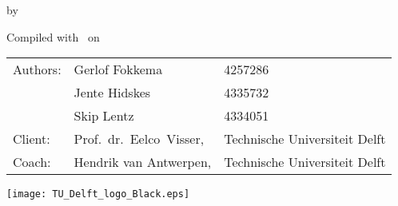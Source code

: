 \makecover

\begin{titlepage}
  \begin{center}
    {\makeatletter
    \largetitlestyle\fontsize{64}{94}\selectfont\@title
    \makeatother}

    {\makeatletter
    \ifx\@subtitle\undefined\else
        \bigskip
       {\tudsffamily\fontsize{22}{32}\selectfont\@subtitle}
    \fi
    \makeatother}

    \bigskip
    \bigskip

    by

    \bigskip
    \bigskip

    {\makeatletter
    \largetitlestyle\fontsize{26}{26}\selectfont\@author
    \makeatother}

    \bigskip
    \bigskip
    \vfill

    {\makeatletter\large
    Compiled with \XeLaTeX\ on \@date\par
    \makeatother}

    \bigskip
    \bigskip
    \vfill

    \begin{tabular}{lll}
      Authors:             & Gerlof Fokkema             & 4257286 \\
                           & Jente Hidskes              & 4335732 \\
                           & Skip Lentz                 & 4334051 \\
      Client:              & Prof.~dr.~Eelco~Visser,    & Technische Universiteit Delft \\
      Coach:               & Hendrik van Antwerpen,     & Technische Universiteit Delft
    \end{tabular}

    \vfill
    \texttt{[image: TU\_Delft\_logo\_Black.eps]}
  \end{center}
\end{titlepage}

